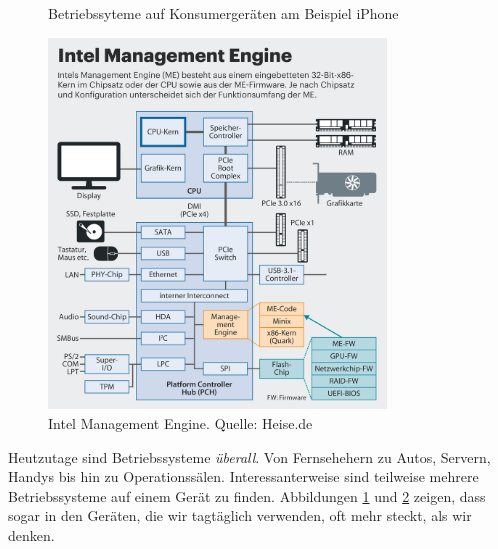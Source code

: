 \documentclass[ngerman,abstract=true]{scrartcl}
\begin{document}
\begin{figure}[p]
\caption{Betriebssyteme auf Konsumergeräten am Beispiel iPhone}\label{fig:osdevices}
\end{figure}
\begin{figure}[p]\centering
\includegraphics[width=0.8\textwidth]{media/intelme}
\caption{Intel Management Engine. Quelle: Heise.de}\label{fig:intelme}
\end{figure}

Heutzutage sind Betriebssysteme \emph{überall}. Von Fernsehehern zu Autos, Servern, Handys bis hin zu Operationssälen. Interessanterweise sind teilweise mehrere Betriebssysteme auf einem Gerät zu finden. Abbildungen \ref{fig:osdevices} und \ref{fig:intelme} zeigen, dass sogar in den Geräten, die wir tagtäglich verwenden, oft mehr steckt, als wir denken.
\end{document}
